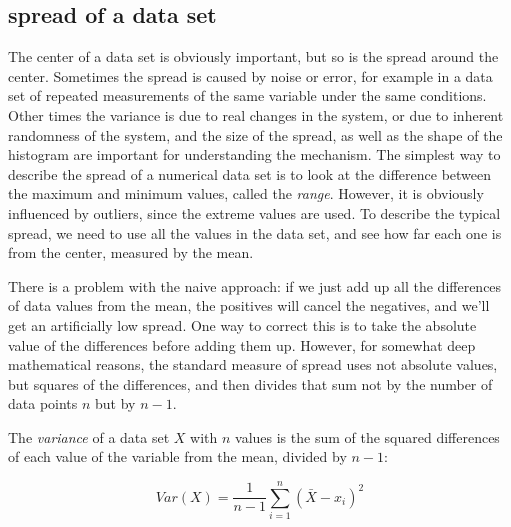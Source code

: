 \documentclass[
  letterpaper,
  DIV=11,
  numbers=noendperiod]{scrreprt}
\begin{document}
\hypertarget{spread-of-a-data-set}{%
\subsection{spread of a data set}\label{spread-of-a-data-set}}

The center of a data set is obviously important, but so is the spread
around the center. Sometimes the spread is caused by noise or error, for
example in a data set of repeated measurements of the same variable
under the same conditions. Other times the variance is due to real
changes in the system, or due to inherent randomness of the system, and
the size of the spread, as well as the shape of the histogram are
important for understanding the mechanism. The simplest way to describe
the spread of a numerical data set is to look at the difference between
the maximum and minimum values, called the 
\emph{range}. However, it is obviously influenced by outliers, since the
extreme values are used. To describe the typical spread, we need to use
all the values in the data set, and see how far each one is from the
center, measured by the mean.

There is a problem with the naive approach: if we just add up all the
differences of data values from the mean, the positives will cancel the
negatives, and we'll get an artificially low spread. One way to correct
this is to take the absolute value of the differences before adding them
up. However, for somewhat deep mathematical reasons, the standard
measure of spread uses not absolute values, but squares of the
differences, and then divides that sum not by the number of data points
\(n\) but by \(n-1\).

\begin{tcolorbox}[enhanced jigsaw, coltitle=black, arc=.35mm, opacitybacktitle=0.6, breakable, bottomtitle=1mm, toptitle=1mm, titlerule=0mm, colback=white, leftrule=.75mm, rightrule=.15mm, colframe=quarto-callout-note-color-frame, colbacktitle=quarto-callout-note-color!10!white, opacityback=0, title=\textcolor{quarto-callout-note-color}{\faInfo}\hspace{0.5em}{Definition}, left=2mm, toprule=.15mm, bottomrule=.15mm]

The \emph{variance} of a data set \(X\) with \(n\) values is the sum of
the squared differences of each value of the variable from the mean,
divided by \(n-1\):

\end{tcolorbox}

\begin{equation}
 Var(X) = \frac{1}{n-1} \sum_{i=1}^n (\bar X - x_i)^2
\end{equation}
\end{document}
